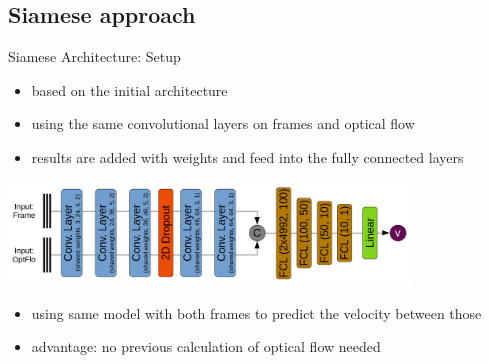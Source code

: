 \subsection{Siamese approach}

\begin{frame}{Siamese Architecture: Setup}
	\begin{itemize}
		\item based on the initial architecture
		\item using the same convolutional layers on frames and optical flow
		\item results are added with weights and feed into the fully connected layers 
	\end{itemize}
	\begin{center}
	\includegraphics[width=0.8\textwidth]{imgs/siamese_model.png}
	\end{center}
	\begin{itemize}
		\item using same model with both frames to predict the velocity between those
		\item advantage: no previous calculation of optical flow needed
	\end{itemize}
\end{frame}

